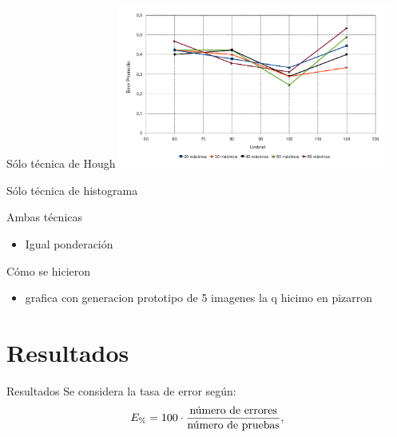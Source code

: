 \documentclass[spanish]{beamer}
\begin{document}
\begin{frame}{Sólo técnica de Hough}
  \includegraphics[width=9cm]{../diagramas/estadistica_noche_iguales}
\end{frame}

\begin{frame}{Sólo técnica de histograma}
\end{frame}

\begin{frame}{Ambas técnicas}
  \begin{itemize}
  \item Igual ponderación
  \end{itemize}
\end{frame}

\begin{frame}{Cómo se hicieron}
  \begin{itemize}
  \item grafica con generacion prototipo de 5 imagenes la q hicimo en pizarron
  \end{itemize}
\end{frame}

\section[Outline]{Resultados}

\begin{frame}{Resultados}
  Se considera la tasa de error según:
  \begin{equation}
    E_\%=100\cdot\frac{\textrm{número de errores}}{\textrm{número de pruebas}},
  \end{equation}
\end{frame}
\end{document}
